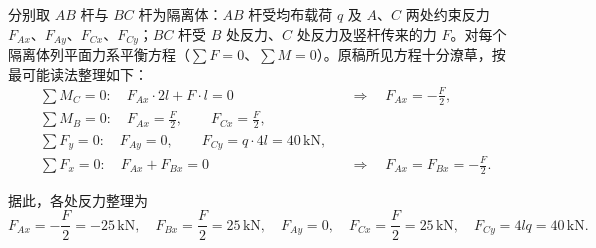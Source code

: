 \begin{solution}
分别取 $AB$ 杆与 $BC$ 杆为隔离体：$AB$ 杆受均布载荷 $q$ 及 $A$、$C$ 两处约束反力 $F_{Ax}$、$F_{Ay}$、$F_{Cx}$、$F_{Cy}$；$BC$ 杆受 $B$ 处反力、$C$ 处反力及竖杆传来的力 $F$。对每个隔离体列平面力系平衡方程（$\sum F=0$、$\sum M=0$）。原稿所见方程十分潦草，按最可能读法整理如下：
\begin{equation}\label{eq:A1-equilib}
\begin{aligned}
&\sum M_C=0:\quad F_{Ax}\cdot 2l+F\cdot l=0
&&\Longrightarrow\quad F_{Ax}=-\frac{F}{2},\\[2pt]
&\sum M_B=0:\quad F_{Ax}=\frac{F}{2},\qquad F_{Cx}=\frac{F}{2},\\[2pt]
&\sum F_y=0:\quad F_{Ay}=0,\qquad F_{Cy}=q\cdot 4l=40\,\mathrm{kN},\\[2pt]
&\sum F_x=0:\quad F_{Ax}+F_{Bx}=0
&&\Longrightarrow\quad F_{Ax}=F_{Bx}=-\frac{F}{2}.
\end{aligned}
\end{equation}%

据此，各处反力整理为
\begin{equation}\label{eq:A1-result}
F_{Ax}=-\frac{F}{2}=-25\,\mathrm{kN},\quad
F_{Bx}=\frac{F}{2}=25\,\mathrm{kN},\quad
F_{Ay}=0,\quad
F_{Cx}=\frac{F}{2}=25\,\mathrm{kN},\quad
F_{Cy}=4lq=40\,\mathrm{kN}.
\end{equation}%
\end{solution}

